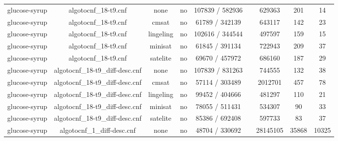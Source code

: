 \begin{appendices}
\begin{table}[p]
\begin{center}
\begin{tabular}{l|cccccccc}
  glucose-syrup                  & algotocnf\_18-t9.cnf           & none       & no    & 107839 / 582936 &           & 629363    & 201        & 14 \\ %
  glucose-syrup                  & algotocnf\_18-t9.cnf           & cmsat      & no    & 61789 / 342139 &           & 643117    & 142        & 23 \\ %
  glucose-syrup                  & algotocnf\_18-t9.cnf           & lingeling  & no    & 102616 / 344544 &           & 497597    & 159        & 15 \\ %
  glucose-syrup                  & algotocnf\_18-t9.cnf           & minisat    & no    & 61845 / 391134 &           & 722943    & 209        & 37 \\ %
  glucose-syrup                  & algotocnf\_18-t9.cnf           & satelite   & no    & 69670 / 457972 &           & 686160    & 187        & 29 \\ %
  glucose-syrup                  & algotocnf\_18-t9\_diff-desc.cnf & none       & no    & 107839 / 831263 &           & 744555    & 132        & 38 \\ %
  glucose-syrup                  & algotocnf\_18-t9\_diff-desc.cnf & cmsat      & no    & 57114 / 303489 &           & 2012701   & 457        & 78 \\ %
  glucose-syrup                  & algotocnf\_18-t9\_diff-desc.cnf & lingeling  & no    & 99452 / 404666 &           & 481297    & 110        & 21 \\ %
  glucose-syrup                  & algotocnf\_18-t9\_diff-desc.cnf & minisat    & no    & 78055 / 511431 &           & 534307    & 90         & 33 \\ %
  glucose-syrup                  & algotocnf\_18-t9\_diff-desc.cnf & satelite   & no    & 85386 / 692408 &           & 597733    & 83         & 37 \\ %
  glucose-syrup                  & algotocnf\_1\_diff-desc.cnf    & none       & no    & 48704 / 330692 &           & 28145105  & 35868      & 10325 \\ %

\end{tabular}
\end{center}
\end{table}
\end{appendices}
